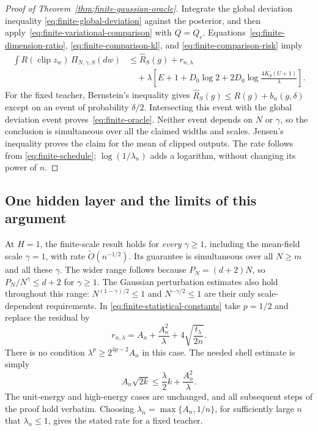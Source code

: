 \begin{proof}[Proof of Theorem~\ref{thm:finite-gaussian-oracle}]
Integrate the global deviation inequality
\eqref{eq:finite-global-deviation} against the posterior, and then
apply~\eqref{eq:finite-variational-comparison} with $Q=Q_r$.
Equations~\eqref{eq:finite-dimension-ratio},
\eqref{eq:finite-comparison-kl}, and
\eqref{eq:finite-comparison-risk} imply
\begin{align*}
 \int R(\operatorname{clip}z_w)\,\Pi_{N,\gamma,S}(dw)
 &\leq\widehat R_S(g)+r_{n,\lambda}\\
 &\quad+\lambda\left[E+1+D_0\log2
               +2D_0\log\frac{4K_g(U+1)}\lambda\right].
\end{align*}
For the fixed teacher, Bernstein's inequality gives
$\widehat R_S(g)\leq R(g)+b_n(g,\delta)$ except on an event of
probability $\delta/2$.  Intersecting this event with the global
deviation event proves~\eqref{eq:finite-oracle}.  Neither event depends
on $N$ or $\gamma$, so the conclusion is simultaneous over all the
claimed widths and scales.  Jensen's inequality proves the claim for
the mean of clipped outputs.  The rate follows from
\eqref{eq:finite-schedule}; $\log(1/\lambda_n)$ adds a logarithm,
without changing its power of $n$.
\end{proof}

\subsection{One hidden layer and the limits of this argument}

At $H=1$, the finite-scale result holds for \emph{every}
$\gamma\geq1$, including the mean-field scale $\gamma=1$, with rate
$\widetilde O(n^{-1/2})$.  Its guarantee is simultaneous over all
$N\geq m$ and all these $\gamma$.  The wider range follows because
$P_N=(d+2)N$, so $P_N/N^\gamma\leq d+2$ for $\gamma\geq1$.
The Gaussian perturbation estimates also hold throughout this range:
$N^{(1-\gamma)/2}\leq1$ and $N^{-\gamma/2}\leq1$ are their only
scale-dependent requirements.  In
\eqref{eq:finite-statistical-constants} take $p=1/2$ and replace the
residual by
\[
 r_{n,\lambda}=A_n+\frac{A_n^2}{\lambda}
                        +4\sqrt{\frac{t_\lambda}{2n}}.
\]
There is no condition $\lambda^p\geq2^{4p-2}A_n$ in this case.
The needed shell estimate is simply
\[
 A_n\sqrt{2k}\leq\frac\lambda2 k+\frac{A_n^2}{\lambda}.
\]
The unit-energy and high-energy cases are unchanged, and all subsequent
steps of the proof hold verbatim.  Choosing
$\lambda_n=\max\{A_n,1/n\}$, for sufficiently large $n$ that
$\lambda_n\leq1$, gives the stated rate for a fixed teacher.

